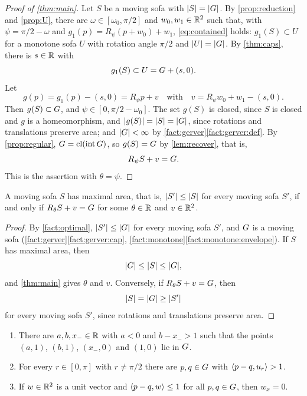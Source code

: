 \begin{proof}[Proof of \cref{thm:main}]
Let $S$ be a moving sofa with $\lvert S\rvert=\lvert G\rvert$. By \cref{prop:reduction} and
\cref{prop:U}, there are $\omega\in[\omega_0,\pi/2]$ and $w_0,w_1\in\mathbb{R}^2$ such
that, with $\psi=\pi/2-\omega$ and $g_1(p)=R_\psi(p+w_0)+w_1$,
\eqref{eq:contained} holds: $g_1(S)\subset U$ for a monotone sofa $U$ with
rotation angle $\pi/2$ and $\lvert U\rvert=\lvert G\rvert$. By \cref{thm:caps}, there is
$s\in\mathbb{R}$ with
\[
  g_1(S)\subset U=G+(s,0).
\]
Let
\[
  g(p)=g_1(p)-(s,0)=R_\psi p+v\quad\text{with}\quad v=R_\psi w_0+w_1-(s,0).
\]
Then $g(S)\subset G$, and $\psi\in[0,\pi/2-\omega_0]$. The set $g(S)$ is
closed, since $S$ is closed and $g$ is a homeomorphism, and
$\lvert g(S)\rvert=\lvert S\rvert=\lvert G\rvert$, since rotations and translations preserve area; and
$\lvert G\rvert<\infty$ by \cref{fact:gerver}\ref{fact:gerver:def}. By
\cref{prop:regular}, $G=\operatorname{cl}(\operatorname{int}G)$, so $g(S)=G$ by
\cref{lem:recover}, that is,
\[
  R_\psi S+v=G.
\]
This is the assertion with $\theta=\psi$.
\end{proof}

\begin{corollary}\label{cor:all}
A moving sofa $S$ has maximal area, that is, $\lvert S'\rvert\le\lvert S\rvert$ for every
moving sofa $S'$, if and only if $R_\theta S+v=G$ for some $\theta\in\mathbb{R}$ and
$v\in\mathbb{R}^2$.
\end{corollary}

\begin{proof}
By \cref{fact:optimal}, $\lvert S'\rvert\le\lvert G\rvert$ for every moving sofa $S'$, and
$G$ is a moving sofa (\cref{fact:gerver}\ref{fact:gerver:cap},
\cref{fact:monotone}\ref{fact:monotone:envelope}). If $S$ has maximal area, then
\[
  \lvert G\rvert\le\lvert S\rvert\le\lvert G\rvert,
\]
and \cref{thm:main} gives $\theta$ and $v$. Conversely, if $R_\theta S+v=G$,
then
\[
  \lvert S\rvert=\lvert G\rvert\ge\lvert S'\rvert
\]
for every moving sofa $S'$, since rotations and translations preserve area.
\end{proof}

\begin{lemma}\label{lem:gerver-width}
\begin{enumerate}[label=(\alph*)]
\item\label{lem:gerver-width:points} There are $a,b,x_-\in\mathbb{R}$ with $a<0$ and
$b-x_->1$ such that the points $(a,1)$, $(b,1)$, $(x_-,0)$ and $(1,0)$ lie in
$G$.
\item\label{lem:gerver-width:gt} For every $r\in[0,\pi]$ with $r\ne\pi/2$ there
are $p,q\in G$ with $\langle p-q,u_r\rangle>1$.
\item\label{lem:gerver-width:vertical} If $w\in\mathbb{R}^2$ is a unit vector and
$\langle p-q,w\rangle\le1$ for all $p,q\in G$, then $w_x=0$.
\end{enumerate}
\end{lemma}

